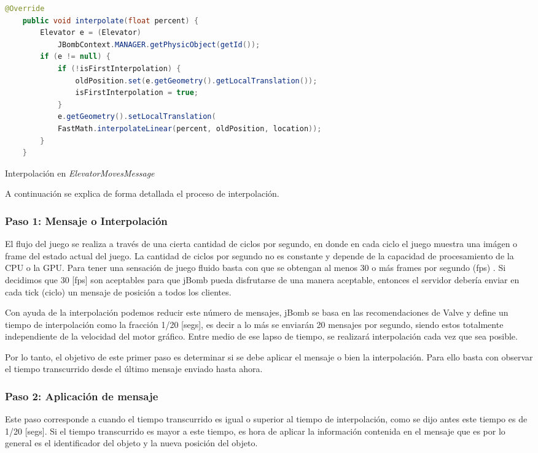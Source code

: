 \documentclass[a4paper,12pt,openany,oneside]{book}
\begin{document}
\newpage
\begin{codigo}
\begin{lstlisting}[language=Java,frame=single,basicstyle=\scriptsize]
	@Override
    public void interpolate(float percent) {
        Elevator e = (Elevator) 
        	JBombContext.MANAGER.getPhysicObject(getId());
        if (e != null) {
            if (!isFirstInterpolation) {
                oldPosition.set(e.getGeometry().getLocalTranslation());
                isFirstInterpolation = true;
            }
            e.getGeometry().setLocalTranslation(
            FastMath.interpolateLinear(percent, oldPosition, location));
        }
    }
\end{lstlisting}
\caption{Interpolación en \textit{ElevatorMovesMessage}}
\label{frag2}
\end{codigo}
A continuación se explica de forma detallada el proceso de interpolación.
\subsubsection{Paso 1: Mensaje o Interpolación}
El flujo del juego se realiza a través de una cierta cantidad de ciclos por segundo, en donde en cada ciclo el juego muestra una imágen o frame del estado actual del juego. La cantidad de ciclos por segundo no es constante y depende de la capacidad de procesamiento de la CPU o la GPU. Para tener una sensación de juego fluido basta con que se obtengan al menos 30 o más frames por segundo (fps) \cite{VALVE1}. Si decidimos que 30 [fps] son aceptables para que jBomb pueda disfrutarse de una manera aceptable, entonces el servidor debería enviar en cada tick (ciclo) un mensaje de posición a todos los clientes.

Con ayuda de la interpolación podemos reducir este número de mensajes, jBomb se basa en las recomendaciones de Valve \cite{VALVE2} y define un tiempo de interpolación como la fracción 1/20 [segs], es decir a lo más se enviarán 20 mensajes por segundo, siendo estos totalmente independiente de la velocidad del motor gráfico. Entre medio de ese lapso de tiempo, se realizará interpolación cada vez que sea posible.

Por lo tanto, el objetivo de este primer paso es determinar si se debe aplicar el mensaje o bien la interpolación. Para ello basta con observar el tiempo transcurrido desde el último mensaje enviado hasta ahora.
\subsubsection{Paso 2: Aplicación de mensaje}
Este paso corresponde a cuando el tiempo transcurrido es igual o superior al tiempo de interpolación, como se dijo antes este tiempo es de 1/20 [segs]. Si el tiempo transcurrido es mayor a este tiempo, es hora de aplicar la información contenida en el mensaje que es por lo general es el identificador del objeto y la nueva posición del objeto.
\end{document}
